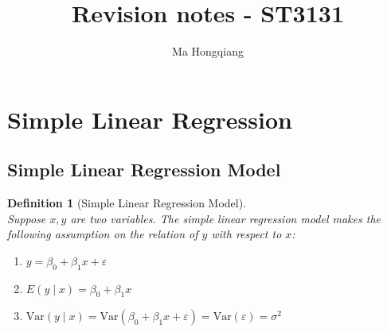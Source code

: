 \documentclass[12pt]{article}
\newcommand{\var}{\mathrm{Var}}
\newtheorem{definition}{Definition}[section]
\theoremstyle{definition}
\begin{document}
\title{Revision notes - ST3131}
\author{Ma Hongqiang}
\maketitle
\tableofcontents

\clearpage
\section{Simple Linear Regression}
\subsection{Simple Linear Regression Model}
\begin{definition}[Simple Linear Regression Model]
\hfill\\\normalfont Suppose $x, y$ are two variables. The simple linear regression model makes the following assumption on the relation of $y$ with respect to $x$:
\begin{enumerate}
  \item $y=\beta_0+\beta_1x+\varepsilon$
  \item $E(y\mid x) = \beta_0+\beta_1x$
  \item $\var(y\mid x) = \var(\beta_0+\beta_1x+\varepsilon) = \var(\varepsilon) = \sigma^2$
\end{enumerate}
\end{definition}
\end{document}
